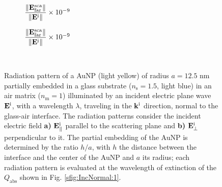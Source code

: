 \begin{figure}[h!]
    \centering
    \def\svgwidth{.8\textwidth}
    \\
        \vspace*{-16.5em}%
        \hspace*{-.2\textwidth}%
    \begin{subfigure}{.4\textwidth}\caption{\footnotesize$\dfrac{\norm{\vb{E}^\text{sca}_\text{far}}}{\norm{\vb{E}^\text{i}}} \times 10^{-9}$  }\label{sfig:Far:IncNorm:a}\end{subfigure}%
    \begin{subfigure}{.4\textwidth}\caption{\footnotesize$\dfrac{\norm{\vb{E}^\text{sca}_\text{far}}}{\norm{\vb{E}^\text{i}}} \times 10^{-9}$  }\label{sfig:Far:IncNorm:b}\end{subfigure}\\[14em]
    \caption[  Radiation pattern of a AuNP supported on a substrate illuminated at oblique incidence ]{Radiation pattern of a AuNP (light yellow) of radius $a = 12.5$ nm partially embedded in a glass substrate ($n_\text{s} = 1.5$, light blue) in an air matrix ($n_\text{m} = 1$) illuminated by an incident electric plane wave $\vb{E}^\text{i}$, with a wavelength $\lambda$, traveling in the $\vb{k}^\text{i}$ direction, normal to the glass-air interface. The radiation patterns consider the incident electric field \textbf{a)} $\vb{E}^\text{i}_\parallel$ parallel to the scattering plane  and \textbf{b)} $\vb{E}^\text{i}_\perp$ perpendicular to it. The partial embedding of the AuNP is determined by the ratio $h/a$, with $h$ the distance between the interface and the center of the AuNP and $a$ its radius; each  radiation pattern is evaluated at the wavelength of extinction of the $Q_\text{abs}$ shown in Fig. \ref{sfig:IncNormal:1}.}
    \label{fig:Far:IncNorm}
\end{figure}

